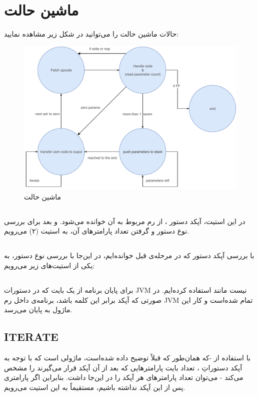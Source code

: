 \section*{
ماشین حالت
}
حالات ماشین حالت را می‌توانید در شکل زیر مشاهده نمایید:
\begin{figure}[H]
	\centering
	\includegraphics[width=0.9\linewidth]{SM}
	\caption{ماشین حالت}
	\label{fig:sm}
\end{figure}
\subsection*{}
در این استیت، آپکد دستور 
،
 از رم مربوط به آن خوانده می‌شود. و بعد برای بررسی نوع دستور و گرفتن تعداد پارامترهای آن، به استیت (۲) می‌رویم. 

\subsection*{}

با بررسی آپکد دستور که در مرحله‌ی قبل خوانده‌ایم، در این‌جا با بررسی نوع دستور، به یکی از استیت‌های زیر می‌رویم:
\subsection*{}
برای پایان برنامه از یک بایت که در دستورات JVM نیست
 مانند
استفاده کرده‌ایم. در صورتی که آپکد برابر این کلمه باشد، برنامه‌ی داخل رم JVM تمام شده‌است و کار این ماژول به پایان می‌رسد. 
\subsection*{ITERATE}
با استفاده از
-که همان‌طور که قبلاً توضیح داده شده‌است، ماژولی است که با توجه به آپکد دستوراتِ
،
  تعداد بایت پارامترهایی که بعد از آن آپکد قرار می‌گیرند را مشخص می‌کند - می‌توان تعداد پارامترهای هر آپکد را در این‌جا داشت. بنابراین اگر پارامتری پس از این آپکد نداشته باشیم، مستقیماً به این استیت می‌رویم.